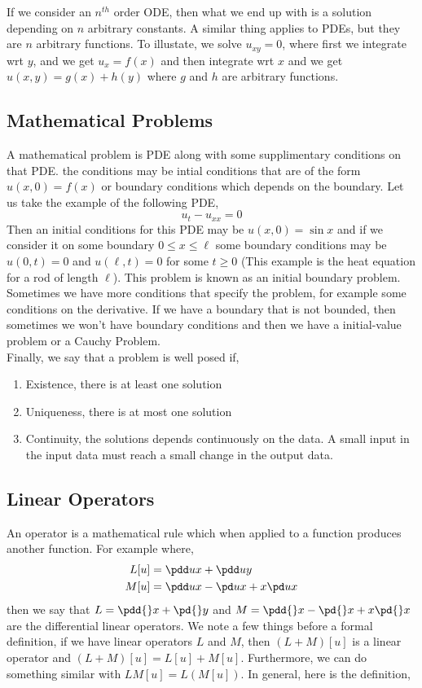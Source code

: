 If we consider an $n^{th}$ order ODE, then what we end up with is a solution depending on $n$ arbitrary constants. A similar thing applies to PDEs, but they are $n$ arbitrary functions. To illustate, we solve $u_{xy} = 0$, where first we integrate wrt $y$, and we get $u_x = f(x)$ and then integrate wrt $x$ and we get $u(x, y) = g(x) + h(y)$ where $g$ and $h$ are arbitrary functions.

\subsection{Mathematical Problems}
A mathematical problem is PDE along with some supplimentary conditions on that PDE. the conditions may be intial conditions that are of the form $u(x, 0) = f(x)$ or boundary conditions which depends on the boundary. Let us take the example of the following PDE,
$$ u_t - u_{xx} = 0 $$
Then an initial conditions for this PDE may be $u(x, 0) = \sin x$ and if we consider it on some boundary $0 \le x \le \ell$ some boundary conditions may be $u(0, t) = 0$ and $u(\ell, t) = 0$ for some $t \ge 0$ (This example is the heat equation for a rod of length $\ell$). This problem is known as an initial boundary problem. Sometimes we have more conditions that specify the problem, for example some conditions on the derivative. If we have a boundary that is not bounded, then sometimes we won't have boundary conditions and then we have a initial-value problem or a Cauchy Problem. \\

Finally, we say that a problem is well posed if,
\begin{enumerate}
  \item Existence, there is at least one solution
  \item Uniqueness, there is at most one solution
  \item Continuity, the solutions depends continuously on the data. A small input in the input data must reach a small change in the output data.
\end{enumerate}

\subsection{Linear Operators}
An operator is a mathematical rule which when applied to a function produces another function. For example where,
\begin{align*}
  L[u] &= \pdd u x + \pdd u y\\
  M[u] &= \pdd u x - \pd u x + x\pd u x
\end{align*}
then we say that $L = \pdd {} x + \pd {} y$ and $M = \pdd {} x - \pd {} x + x\pd {} x$ are the differential linear operators. We note a few things before a formal definition, if we have linear operators $L$ and $M$, then $(L + M)[u]$ is a linear operator and $(L + M)[u] = L[u] + M[u]$. Furthermore, we can do something similar with $LM[u] = L(M[u])$. In general, here is the definition,

